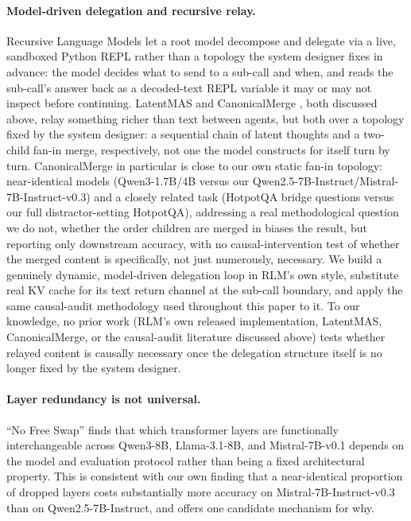 \documentclass[11pt]{article}
\begin{document}
\paragraph{Model-driven delegation and recursive relay.} Recursive
Language Models \citep{rlm2026} let a root model decompose and delegate
via a live, sandboxed Python REPL rather than a topology the system
designer fixes in advance: the model decides what to send to a sub-call
and when, and reads the sub-call's answer back as a decoded-text REPL
variable it may or may not inspect before continuing. LatentMAS
\citep{latentmas2026} and CanonicalMerge \citep{canonicalmerge2026}, both
discussed above, relay something richer than text between agents, but
both over a topology fixed by the system designer: a sequential chain of
latent thoughts and a two-child fan-in merge, respectively, not one the
model constructs for itself turn by turn. CanonicalMerge in particular is
close to our own static fan-in topology: near-identical models
(Qwen3-1.7B/4B versus our Qwen2.5-7B-Instruct/Mistral-7B-Instruct-v0.3)
and a closely related task (HotpotQA bridge questions versus our full
distractor-setting HotpotQA), addressing a real methodological question
we do not, whether the order children are merged in biases the result,
but reporting only downstream accuracy, with no causal-intervention test
of whether the merged content is specifically, not just numerously,
necessary. We build a genuinely dynamic, model-driven delegation loop in
RLM's own style, substitute real KV cache for its text return channel at
the sub-call boundary, and apply the same causal-audit methodology used
throughout this paper to it. To our knowledge, no prior work (RLM's own
released implementation, LatentMAS, CanonicalMerge, or the causal-audit
literature discussed above) tests whether relayed content is causally
necessary once the delegation structure itself is no longer fixed by the
system designer.

\paragraph{Layer redundancy is not universal.} ``No Free Swap''
\citep{nofreeswap2026} finds that which transformer layers are
functionally interchangeable across Qwen3-8B, Llama-3.1-8B, and
Mistral-7B-v0.1 depends on the model and evaluation protocol rather than
being a fixed architectural property. This is consistent with our own
finding that a near-identical proportion of dropped layers costs
substantially more accuracy on Mistral-7B-Instruct-v0.3 than on
Qwen2.5-7B-Instruct, and offers one candidate mechanism for why.
\end{document}
